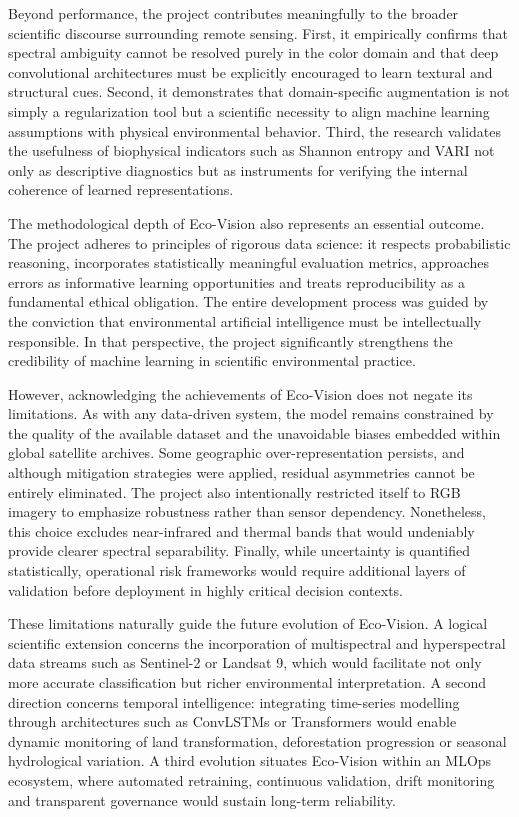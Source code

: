 \documentclass[12pt,a4paper]{report}
\begin{document}
Beyond performance, the project contributes meaningfully to the broader scientific discourse surrounding remote sensing. First, it empirically confirms that spectral ambiguity cannot be resolved purely in the color domain and that deep convolutional architectures must be explicitly encouraged to learn textural and structural cues. Second, it demonstrates that domain-specific augmentation is not simply a regularization tool but a scientific necessity to align machine learning assumptions with physical environmental behavior. Third, the research validates the usefulness of biophysical indicators such as Shannon entropy and VARI not only as descriptive diagnostics but as instruments for verifying the internal coherence of learned representations.

The methodological depth of Eco-Vision also represents an essential outcome. The project adheres to principles of rigorous data science: it respects probabilistic reasoning, incorporates statistically meaningful evaluation metrics, approaches errors as informative learning opportunities and treats reproducibility as a fundamental ethical obligation. The entire development process was guided by the conviction that environmental artificial intelligence must be intellectually responsible. In that perspective, the project significantly strengthens the credibility of machine learning in scientific environmental practice.

However, acknowledging the achievements of Eco-Vision does not negate its limitations. As with any data-driven system, the model remains constrained by the quality of the available dataset and the unavoidable biases embedded within global satellite archives. Some geographic over-representation persists, and although mitigation strategies were applied, residual asymmetries cannot be entirely eliminated. The project also intentionally restricted itself to RGB imagery to emphasize robustness rather than sensor dependency. Nonetheless, this choice excludes near-infrared and thermal bands that would undeniably provide clearer spectral separability. Finally, while uncertainty is quantified statistically, operational risk frameworks would require additional layers of validation before deployment in highly critical decision contexts.

These limitations naturally guide the future evolution of Eco-Vision. A logical scientific extension concerns the incorporation of multispectral and hyperspectral data streams such as Sentinel-2 or Landsat 9, which would facilitate not only more accurate classification but richer environmental interpretation. A second direction concerns temporal intelligence: integrating time-series modelling through architectures such as ConvLSTMs or Transformers would enable dynamic monitoring of land transformation, deforestation progression or seasonal hydrological variation. A third evolution situates Eco-Vision within an MLOps ecosystem, where automated retraining, continuous validation, drift monitoring and transparent governance would sustain long-term reliability.
\end{document}
